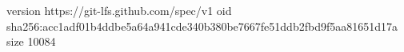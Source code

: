 version https://git-lfs.github.com/spec/v1
oid sha256:acc1adf01b4ddbe5a64a941cde340b380be7667fe51ddb2fbd9f5aa81651d17a
size 10084
